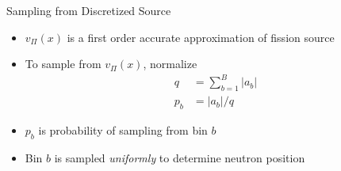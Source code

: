 \documentclass[xcolor={usenames, dvipsnames},]{beamer}
\newcommand{\vP}{\ensuremath{v_{\Pi}}}
\begin{document}
\begin{frame}{Sampling from Discretized Source}
    \begin{itemize}
        \item $\vP(x)$ is a first order accurate approximation of fission source
        \item To sample from $\vP(x)$, normalize
            \begin{align*}
                q &= \sum_{b=1}^B \left|a_b\right| \\[0.5em]
                p_b &= \left|a_b\right|/q
            \end{align*}
        \item $p_b$ is probability of sampling from bin $b$
        \item Bin $b$ is sampled \emph{uniformly} to determine neutron position
    \end{itemize}
\end{frame}
\end{document}
